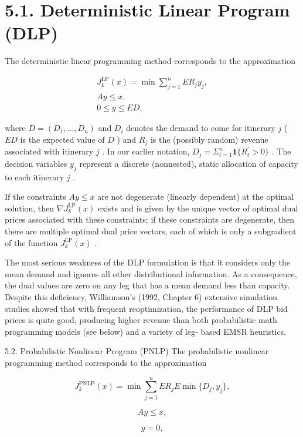 \section{5.1. Deterministic Linear Program
(DLP)}\label{deterministic-linear-program-dlp}

The deterministic linear programming method corresponds to the
approximation

\[
\begin{array}{c}{{J_{k}^{\mathrm{LP}}(x)=\min \sum_{j=1}^{n}E R_{j}y_{j},}}\\ {{A y\leq x,}}\\ {{0\leq y\leq E D,}}\end{array}
\]

where \(D = (D_{1},\ldots ,D_{n})\) and \(D_{i}\) denotes the demand to
come for itinerary \(j\) ( \(ED\) is the expected value of \(D\) ) and
\(R_{j}\) is the (possibly random) revenue associated with itinerary
\(j\) . In our earlier notation,
\(D_{j} = \Sigma_{t = 1}^{n} \mathbf{1}\{R_{t}^{\prime} > 0\}\) . The
decision variables \(y_{j}\) represent a discrete (nonnested), static
allocation of capacity to each itinerary \(j\) .

If the constraints \(A y\leq x\) are not degenerate (linearly dependent)
at the optimal solution, then \(\nabla J_{k}^{\mathrm{LP}}(x)\) exists
and is given by the unique vector of optimal dual prices associated with
these constraints; if these constraints are degenerate, then there are
multiple optimal dual price vectors, each of which is only a subgradient
of the function \(J_{k}^{\mathrm{LP}}(x)\) .

The most serious weakness of the DLP formulation is that it considers
only the mean demand and ignores all other distributional information.
As a consequence, the dual values are zero on any leg that has a mean
demand less than capacity. Despite this deficiency, Williamson's (1992,
Chapter 6) extensive simulation studies showed that with frequent
reoptimization, the performance of DLP bid prices is quite good,
producing higher revenue than both probabilistic math programming models
(see below) and a variety of leg- based EMSR heuristics.

5.2. Probabilistic Nonlinear Program (PNLP) The probabilistic nonlinear
programming method corresponds to the approximation

\[
J_{k}^{\mathrm{PNLP}}(x) = \min \sum_{j = 1}^{n}E R_{j}E\min \{D_{j},y_{j}\} ,
\]

\[
A y\leq x,
\]

\[
y = 0,
\]

